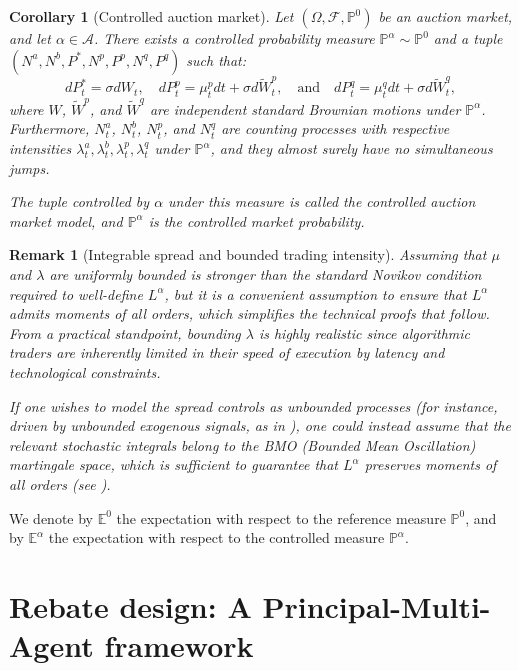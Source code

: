 \documentclass[12pt]{article}
\newtheorem{corollary}[theorem2]{Corollary}
\newtheorem{remark}[theorem2]{Remark}
\begin{document}
\begin{corollary}[Controlled auction market]
Let $(\Omega,\mathcal{F},\mathbb{P}^0)$ be an auction market, and let $\alpha \in \mathcal{A}$. There exists a controlled probability measure $\mathbb{P}^\alpha \sim \mathbb{P}^0$ and a tuple $(N^a, N^b, P^*, N^p, P^p, N^q, P^q)$ such that:
\[dP^*_t = \sigma dW_t, \quad dP^p_t = \mu^p_t dt + \sigma d\tilde{W}^p_t, \quad \text{and} \quad dP^q_t = \mu^q_t dt + \sigma d\tilde{W}^q_t,\] 
where $W$, $\tilde{W}^p$, and $\tilde{W}^q$ are independent standard Brownian motions under $\mathbb{P}^{\alpha}$. Furthermore, $N_t^{a}$, $N_t^{b}$, $N_t^{p}$, and $N_t^{q}$ are counting processes with respective intensities $\lambda^a_t, \lambda^b_t, \lambda^p_t, \lambda^q_t$ under $\mathbb{P}^{\alpha}$, and they almost surely have no simultaneous jumps. 

The tuple controlled by $\alpha$ under this measure is called the controlled auction market model, and $\mathbb{P}^\alpha$ is the controlled market probability.
\end{corollary} 

\begin{remark}[Integrable spread and bounded trading intensity]
Assuming that $\mu$ and $\lambda$ are uniformly bounded is stronger than the standard Novikov condition required to well-define $L^\alpha$, but it is a convenient assumption to ensure that $L^\alpha$ admits moments of all orders, which simplifies the technical proofs that follow. From a practical standpoint, bounding $\lambda$ is highly realistic since algorithmic traders are inherently limited in their speed of execution by latency and technological constraints. 

If one wishes to model the spread controls as unbounded processes (for instance, driven by unbounded exogenous signals, as in \cite{derchu2023equilibria}), one could instead assume that the relevant stochastic integrals belong to the BMO (Bounded Mean Oscillation) martingale space, which is sufficient to guarantee that $L^\alpha$ preserves moments of all orders (see \cite[Chapter 3]{kazamaki2006continuous}).
\end{remark}

We denote by $\mathbb{E}^0$ the expectation with respect to the reference measure $\mathbb{P}^0$, and by $\mathbb{E}^{\alpha}$ the expectation with respect to the controlled measure $\mathbb{P}^{\alpha}$.
\section{Rebate design: A Principal-Multi-Agent framework}
\label{sec:principalagent}
\end{document}
